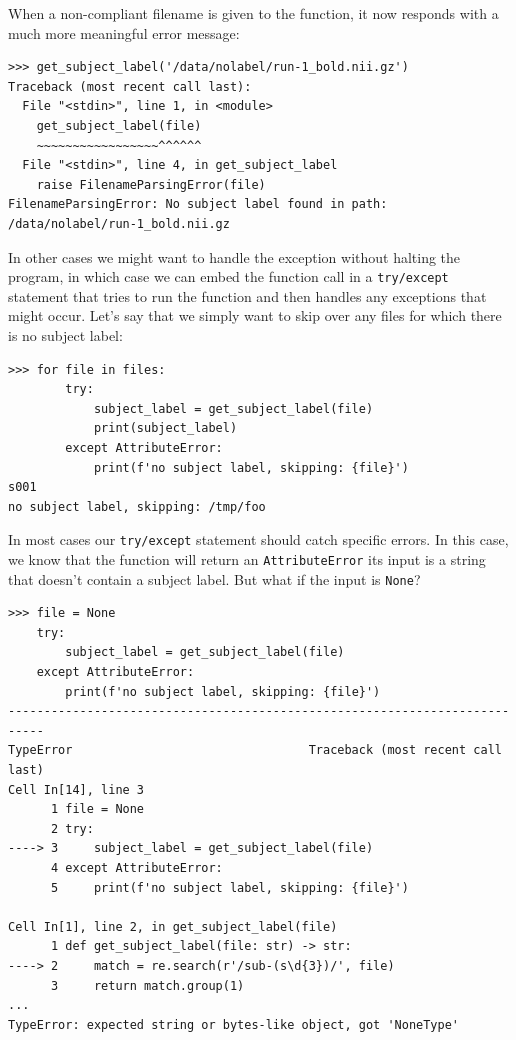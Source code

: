 When a non-compliant filename is given to the function, it now responds with a much more meaningful error message:

\begin{lstlisting}[style=repl]
>>> get_subject_label('/data/nolabel/run-1_bold.nii.gz')
Traceback (most recent call last):
  File "<stdin>", line 1, in <module>
    get_subject_label(file)
    ~~~~~~~~~~~~~~~~~^^^^^^
  File "<stdin>", line 4, in get_subject_label
    raise FilenameParsingError(file)
FilenameParsingError: No subject label found in path: /data/nolabel/run-1_bold.nii.gz
\end{lstlisting}


In other cases we might want to handle the exception without halting the program, in which case we can embed the function call in a \texttt{try/except} statement that tries to run the function and then handles any exceptions that might occur.
Let's say that we simply want to skip over any files for which there is no subject label:

\begin{lstlisting}[style=repl]
>>> for file in files:
        try:
            subject_label = get_subject_label(file)
            print(subject_label)
        except AttributeError:
            print(f'no subject label, skipping: {file}')
s001
no subject label, skipping: /tmp/foo
\end{lstlisting}

In most cases our \texttt{try/except} statement should catch specific errors.
In this case, we know that the function will return an \texttt{AttributeError} its input is a string that doesn't contain a subject label.
But what if the input is \texttt{None}?

\begin{lstlisting}[style=repl]
>>> file = None
    try:
        subject_label = get_subject_label(file)
    except AttributeError:
        print(f'no subject label, skipping: {file}')
---------------------------------------------------------------------------
TypeError                                 Traceback (most recent call last)
Cell In[14], line 3
      1 file = None
      2 try:
----> 3     subject_label = get_subject_label(file)
      4 except AttributeError:
      5     print(f'no subject label, skipping: {file}')

Cell In[1], line 2, in get_subject_label(file)
      1 def get_subject_label(file: str) -> str:
----> 2     match = re.search(r'/sub-(s\d{3})/', file)
      3     return match.group(1)
...
TypeError: expected string or bytes-like object, got 'NoneType'
\end{lstlisting}

